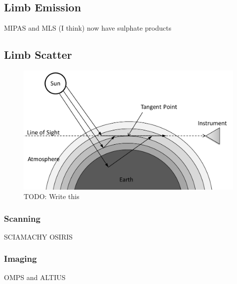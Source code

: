 \subsection{Limb Emission}

MIPAS and MLS (I think) now have sulphate products


\subsection{Limb Scatter}

\begin{figure}[h]
    \includegraphics[width=1.0\textwidth]{./Images/LimbScatterGeometry.pdf}
    \caption[Limb Scatter Geometry]{TODO: Write this}
    \label{fig:LimbScatterGeometry}
\end{figure}

\subsubsection{Scanning}

SCIAMACHY OSIRIS

\subsubsection{Imaging}

OMPS and ALTIUS 